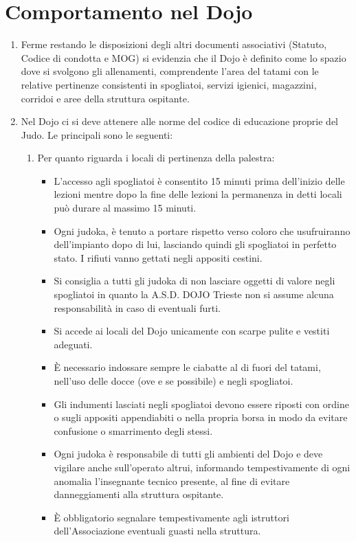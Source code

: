 \documentclass{djtsasddoc}
\begin{document}
	\section{Comportamento nel Dojo}
	\begin{enumerate}
		\item Ferme restando le disposizioni degli altri documenti associativi (Statuto, Codice di condotta e MOG) si evidenzia che il Dojo è definito come lo spazio dove si svolgono gli allenamenti, comprendente l'area del tatami con le relative pertinenze consistenti in spogliatoi, servizi igienici, magazzini, corridoi e aree della struttura ospitante.
		\item Nel Dojo ci si deve attenere alle norme del codice di educazione proprie del Judo. Le principali sono le seguenti:
		\begin{enumerate}
			\item Per quanto riguarda i locali di pertinenza della palestra:
			\begin{itemize}
				\item L'accesso agli spogliatoi è consentito 15 minuti prima dell'inizio delle lezioni mentre dopo la fine delle lezioni la permanenza in detti locali può durare al massimo 15 minuti.
				\item Ogni judoka, è tenuto a portare rispetto verso coloro che usufruiranno dell'impianto dopo di lui, lasciando quindi gli spogliatoi in perfetto stato. I rifiuti vanno gettati negli appositi cestini.
				\item Si consiglia a tutti gli judoka di non lasciare oggetti di valore negli spogliatoi in quanto la A.S.D. DOJO Trieste non si assume alcuna responsabilità in caso di eventuali furti.
				\item Si accede ai locali del Dojo unicamente con scarpe pulite e vestiti adeguati.
				\item È necessario indossare sempre le ciabatte al di fuori del tatami, nell'uso delle docce (ove e se possibile) e negli spogliatoi.
				\item Gli indumenti lasciati negli spogliatoi devono essere riposti con ordine o sugli appositi appendiabiti o nella propria borsa in modo da evitare confusione o smarrimento degli stessi.
				\item Ogni judoka è responsabile di tutti gli ambienti del Dojo e deve vigilare anche sull'operato altrui, informando tempestivamente di ogni anomalia l'insegnante tecnico presente, al fine di evitare danneggiamenti alla struttura ospitante. 
				\item È obbligatorio segnalare tempestivamente agli istruttori dell'Associazione eventuali guasti nella struttura.

\end{itemize}
\end{enumerate}
\end{enumerate}
\end{document}
